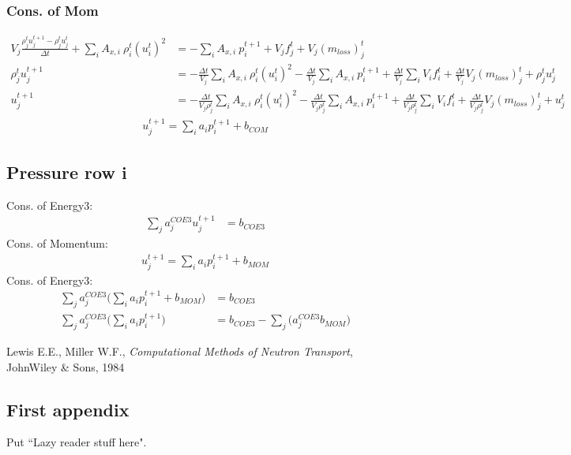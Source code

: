 \documentclass[11pt,letterpaper,notitlepage]{article}
\newcommand{\beqn}{\begin{equation}
		\begin{aligned}}
\newcommand{\eeqn}{\end{aligned}
\end{equation}}
\numberwithin{equation}{section}
\begin{document}
\subsubsection{Cons. of Mom}
\beqn 
V_j \frac{\rho_j^t u_j^{t+1} - \rho_j^t u_j^t}{\Delta t} +
\sum_i A_{x,i} \ \rho_i^t (u_i^t)^2  &= -\sum_i A_{x,i} \ p_i^{t+1} + V_j f_j^t + V_j (m_{loss})_j^t 
\\
\rho_j^t u_j^{t+1} &= 
- \frac{\Delta t}{V_j}\sum_i A_{x,i} \ \rho_i^t (u_i^t)^2
-\frac{\Delta t}{V_j} \sum_i A_{x,i} \ p_i^{t+1}
+\frac{\Delta t}{V_j}\sum_i V_i f_i^t 
+\frac{\Delta t}{V_j} V_j (m_{loss})_j^t 
+\rho_j^t u_j^t
\\
u_j^{t+1} &= 
- \frac{\Delta t}{V_j \rho_j^t }\sum_i A_{x,i} \ \rho_i^t (u_i^t)^2
-\frac{\Delta t}{V_j \rho_j^t } \sum_i A_{x,i} \ p_i^{t+1}
+\frac{\Delta t}{V_j \rho_j^t }\sum_i V_i f_i^t 
+\frac{\Delta t}{V_j \rho_j^t } V_j (m_{loss})_j^t 
+u_j^t
\eeqn
\beqn
u_j^{t+1} = \sum_i a_i p_i^{t+1} + b_{COM}
\eeqn 

\subsection{Pressure row i}
Cons. of Energy3:
\beqn 
\sum_j a_j^{COE3}u_j^{t+1} &= b_{COE3}
\eeqn
Cons. of Momentum:
\beqn 
u_j^{t+1} = \sum_i a_i p_i^{t+1} + b_{MOM}
\eeqn 
Cons. of Energy3:
\beqn 
\sum_j a_j^{COE3}\biggr( \sum_i a_i p_i^{t+1} + b_{MOM} \biggr) &= b_{COE3}
\\
\sum_j a_j^{COE3}\biggr( \sum_i a_i p_i^{t+1} \biggr) &=
b_{COE3} - \sum_j \biggr( a_j^{COE3} b_{MOM} \biggr)
\eeqn

\newpage
\begin{thebibliography}{1}
	
	 Lewis E.E., Miller W.F., {\em Computational Methods of Neutron Transport}, JohnWiley \& Sons, 1984
	   
\end{thebibliography}

\newpage
\begin{appendices}
\section{First appendix}
Put ``Lazy reader stuff here".
\end{appendices}
\end{document}
